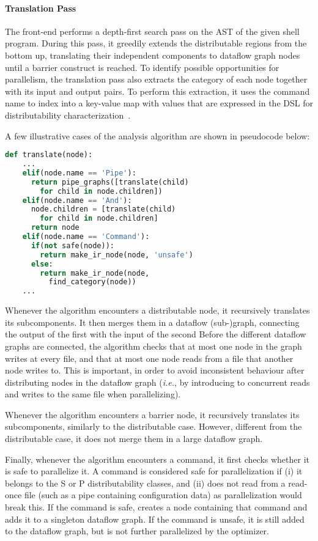 \documentclass[sigplan,10pt,review,anonymous]{acmart}
\newcommand{\ie}{{\em i.e.}, }
\newcommand{\cn}[1]{\mbox{\textcircled{\footnotesize #1}}}
\newcommand{\pur}{\cn{\textsc{P}}\xspace}
\newcommand{\sta}{\cn{\textsc{S}}\xspace}
\begin{document}
\paragraph{Translation Pass}
The \sys front-end performs a depth-first search pass on the AST of the given shell program.
During this pass, it greedily extends the distributable regions from the bottom up, translating their independent components to dataflow graph nodes until a barrier construct is reached.
To identify possible opportunities for parallelism, the translation pass also extracts the category of each node together with its input and output pairs.
To perform this extraction, it uses the command name to index into a key-value map with values that are expressed in the DSL for distributability characterization~.

A few illustrative cases of the analysis algorithm are shown in pseudocode below:

\begin{lstlisting}[language=python, float=h]
  def translate(node):
    ...
    elif(node.name == 'Pipe'):
      return pipe_graphs([translate(child)
        for child in node.children])
    elif(node.name == 'And'):
      node.children = [translate(child)
        for child in node.children]
      return node
    elif(node.name == 'Command'):
      if(not safe(node)):
        return make_ir_node(node, 'unsafe')
      else:
        return make_ir_node(node,
          find_category(node))
    ...
\end{lstlisting}

Whenever the algorithm encounters a distributable node, it recursively
translates its subcomponents.
It then merges them in a dataflow (sub-)graph, connecting the output of the first with the input of the second
Before the different dataflow graphs are connected, the
algorithm checks that at most one node in the graph writes at every
file, and that at most one node reads from a file that another node writes
to. This is important, in order to avoid inconsistent behaviour after
distributing nodes in the dataflow graph (\ie by introducing to
concurrent reads and writes to the same file when
parallelizing).

Whenever the algorithm encounters a barrier node,
it recursively translates its subcomponents, similarly to the distributable
case.
However, different from the distributable case, it does not merge them in a large dataflow graph.

Finally, whenever the algorithm encounters a command, it first
checks whether it is safe to parallelize it. A command is considered
safe for parallelization if (i) it belongs to the \sta or \pur distributability classes, and (ii) does not read from a read-once file (such as a pipe containing configuration data) as parallelization would break this. %
If the command is safe, \sys creates a node containing that command  and adds it to a singleton dataflow graph.
If the command is unsafe, it is still added to the dataflow graph, but is not further parallelized by the optimizer.
\end{document}
